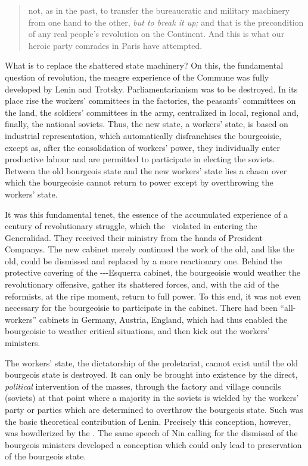 \begin{quotation}
  \noindent
  not, as in the past, to transfer the bureaucratic and military machinery from one hand to the other, \emph{but to break it up;} and that is the precondition of any real people’s revolution on the Continent. And this is what our heroic party comrades in Paris have attempted.
\end{quotation}

What is to replace the shattered state machinery? On this, the fundamental question of revolution, the meagre experience of the Commune was fully developed by Lenin and Trotsky. Parliamentarianism was to be destroyed. In its place rise the workers’ committees in the factories, the peasants’ committees on the land, the soldiers’ committees in the army, centralized in local, regional and, finally, the national soviets. Thus, the new state, a workers’ state, is based on industrial representation, which automatically disfranchises the bourgeoisie, except as, after the consolidation of workers’ power, they individually enter productive labour and are permitted to participate in electing the soviets. Between the old bourgeois state and the new workers’ state lies a chasm over which the bourgeoisie cannot return to power except by overthrowing the workers’ state.

It was this fundamental tenet, the essence of the accumulated experience of a century of revolutionary struggle, which the \POUM\ violated in entering the Generalidad. They received their ministry from the hands of President Companys. The new cabinet merely continued the work of the old, and like the old, could be dismissed and replaced by a more reactionary one. Behind the protective covering of the \POUM-\CNT-\PSUC-Esquerra cabinet, the bourgeoisie would weather the revolutionary offensive, gather its shattered forces, and, with the aid of the reformists, at the ripe moment, return to full power. To this end, it was not even necessary for the bourgeoisie to participate in the cabinet. There had been ``all-workers'' cabinets in Germany, Austria, England, which had thus enabled the bourgeoisie to weather critical situations, and then kick out the workers’ ministers.

The workers’ state, the dictatorship of the proletariat, cannot exist until the old bourgeois state is destroyed. It can only be brought into existence by the direct, \emph{political} intervention of the masses, through the factory and village councils (soviets) at that point where a majority in the soviets is wielded by the workers’ party or parties which are determined to overthrow the bourgeois state. Such was the basic theoretical contribution of Lenin. Precisely this conception, however, was bowdlerized by the \POUM. The same speech of Nin calling for the dismissal of the bourgeois ministers developed a conception which could only lead to preservation of the bourgeois state.

